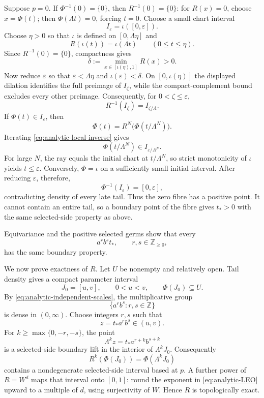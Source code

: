 \documentclass[11pt]{article}
\theoremstyle{definition}
\theoremstyle{remark}
\newcommand{\I}{[0,1]}
\begin{document}
Suppose \(p=0\).  If \(\Phi^{-1}(0)=\{0\}\), then
\(R^{-1}(0)=\{0\}\): for \(R(x)=0\), choose \(x=\Phi(t)\); then
\(\Phi(\Lambda t)=0\), forcing \(t=0\).  Choose a small chart interval
\[
 I_\varepsilon=\iota([0,\varepsilon]).
\]
Choose \(\eta>0\) so that \(\iota\) is defined on
\([0,\Lambda\eta]\) and
\[
 R(\iota(t))=\iota(\Lambda t)\qquad(0\leq t\leq\eta).
\]
Since \(R^{-1}(0)=\{0\}\), compactness gives
\[
 \delta:=\min_{x\in[\iota(\eta),1]}R(x)>0.
\]
Now reduce \(\varepsilon\) so that
\(\varepsilon<\Lambda\eta\) and \(\iota(\varepsilon)<\delta\).
On \([0,\iota(\eta)]\) the displayed dilation identifies the full preimage
of \(I_\zeta\), while the compact-complement bound excludes every other
preimage.  Consequently, for \(0<\zeta\leq\varepsilon\),
\begin{equation}\label{eq:analytic-local-inverse}
  R^{-1}(I_\zeta)=I_{\zeta/\Lambda}.
\end{equation}
If \(\Phi(t)\in I_\varepsilon\), then
\[
 \Phi(t)=R^N\bigl(\Phi(t/\Lambda^N)\bigr).
\]
Iterating \eqref{eq:analytic-local-inverse} gives
\[
 \Phi(t/\Lambda^N)\in I_{\varepsilon/\Lambda^N}.
\]
For large \(N\), the ray equals the initial chart at \(t/\Lambda^N\), so
strict monotonicity of \(\iota\) yields \(t\leq\varepsilon\).  Conversely,
\(\Phi=\iota\) on a sufficiently small initial interval.  After reducing
\(\varepsilon\), therefore,
\[
 \Phi^{-1}(I_\varepsilon)=[0,\varepsilon],
\]
contradicting density of every late tail.  Thus the zero fibre has a positive
point.  It cannot contain an entire tail, so a boundary point of the fibre
gives \(t_*>0\) with the same selected-side property as above.

Equivariance and the positive selected germs show that every
\begin{equation}\label{eq:analytic-actor-boundaries}
 a^rb^s t_*,\qquad r,s\in\mathbb Z_{\geq0},
\end{equation}
has the same boundary property.

We now prove exactness of \(R\).  Let \(U\) be nonempty and relatively open.
Tail density gives a compact parameter interval
\[
 J_0=[u,v],\qquad0<u<v,\qquad\Phi(J_0)\subseteq U.
\]
By \eqref{eq:analytic-independent-scales}, the multiplicative group
\[
 \{a^rb^s:r,s\in\mathbb Z\}
\]
is dense in \((0,\infty)\).  Choose integers \(r,s\) such that
\[
 z=t_*a^rb^s\in(u,v).
\]
For \(k\geq\max\{0,-r,-s\}\), the point
\[
 \Lambda^kz=t_*a^{r+k}b^{s+k}
\]
is a selected-side boundary lift in the interior of \(\Lambda^kJ_0\).
Consequently
\[
 R^k(\Phi(J_0))=\Phi(\Lambda^kJ_0)
\]
contains a nondegenerate selected-side interval based at \(p\).  A further
power of \(R=W^d\) maps that interval onto \(\I\): round the exponent in
\eqref{eq:analytic-LEO} upward to a multiple of \(d\), using surjectivity of
\(W\).  Hence \(R\) is topologically exact.
\end{document}
